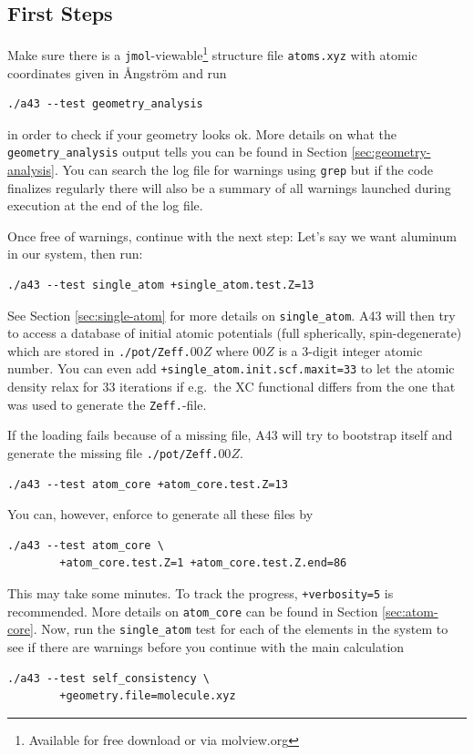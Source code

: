 \documentclass[oribibl]{llncs}
\newcommand{\ttt}[1]{\texttt{#1}}
\newcommand{\codename}{A43}
\begin{document}
\subsection{First Steps} \label{sec:first-steps}
%
Make sure there is a \ttt{jmol}-viewable\footnote{Available for free download or via molview.org} structure file \ttt{atoms.xyz}
with atomic coordinates given in \AA{}ngstr\"{o}m and run
\begin{verbatim}
./a43 --test geometry_analysis
\end{verbatim}
in order to check if your geometry looks ok.
More details on what the \ttt{geometry\_analysis} output tells you can be found in Section \ref{sec:geometry-analysis}.
You can search the log file for warnings using \ttt{grep} but
if the code finalizes regularly
there will also be a summary of all warnings launched during execution at the end of the log file.
%

\noindent
Once free of warnings, continue with the next step:
Let's say we want aluminum in our system, then run:
\begin{verbatim}
./a43 --test single_atom +single_atom.test.Z=13
\end{verbatim}
See Section \ref{sec:single-atom} for more details on \ttt{single\_atom}.
%
\noindent
\codename{} will then try to access a database of initial atomic potentials
(full spherically, spin-degenerate) which are stored in \ttt{./pot/Zeff.}$00Z$
where $00Z$ is a 3-digit integer atomic number.
You can even add \ttt{+single\_atom.init.scf.maxit=33} to let the atomic density relax for $33$ iterations if e.g.~the \ac{XC} functional differs from the one that was used to generate the \ttt{Zeff.}-file.

\noindent
If the loading fails because of a missing file, 
\codename{} will try to bootstrap itself and generate the missing file \ttt{./pot/Zeff.}$00Z$.
\begin{verbatim}
./a43 --test atom_core +atom_core.test.Z=13
\end{verbatim}
You can, however, enforce to generate all these files by
\begin{verbatim}
./a43 --test atom_core \
        +atom_core.test.Z=1 +atom_core.test.Z.end=86
\end{verbatim}
This may take some minutes. To track the progress, \ttt{+verbosity=5} is recommended.
More details on \ttt{atom\_core} can be found in Section \ref{sec:atom-core}.
\todo[inline]{OpenMP would be good here}
%
\noindent
Now, run the \ttt{single\_atom} test for each of the elements in the system 
to see if there are warnings before you continue with the main calculation
\begin{verbatim}
./a43 --test self_consistency \
        +geometry.file=molecule.xyz
\end{verbatim}
%
\end{document}
